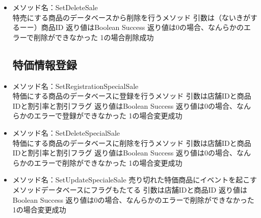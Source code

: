 \documentclass[a4j]{jarticle}
\begin{document}
\begin{itemize}
\item メソッド名：SetDeleteSale\\
特売にする商品のデータベースから削除を行うメソッド
引数は（ないきがするーー）商品ID
返り値はBoolean Success
返り値は0の場合、なんらかのエラーで削除ができなかった
1の場合削除成功

\subsection{特価情報登録}
%
\item メソッド名：SetRegistrationSpecialSale\\
特価にする商品のデータベースに登録を行うメソッド
引数は店舗IDと商品IDと割引率と割引フラグ
返り値はBoolean Success
返り値は0の場合、なんらかのエラーで登録ができなかった
1の場合変更成功
%
\item メソッド名：SetDeleteSpecialSale\\
特価にする商品のデータベースに削除を行うメソッド
引数は店舗IDと商品IDと割引率と割引フラグ
返り値はBoolean Success
返り値は0の場合、なんらかのエラーで削除ができなかった
1の場合変更成功
%
\item メソッド名：SetUpdateSpecialeSale
売り切れた特価商品にイベントを起こすメソッドデータベースにフラグもたてる
引数は店舗IDと商品ID
返り値はBoolean Success
返り値は0の場合、なんらかのエラーで削除ができなかった
1の場合変更成功

\end{itemize}
\end{document}
